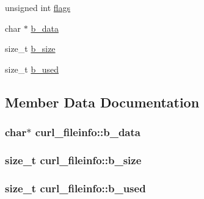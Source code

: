 \begin{DoxyCompactItemize}
\begin{tabbing}
\end{tabbing}\item 
unsigned int \hyperlink{structcurl__fileinfo_a4db8370a5202c50f4e3cf57bc0002c79}{flags}
\item 
char $\ast$ \hyperlink{structcurl__fileinfo_a3cf37a35ea7150ebf3b084c8804832c5}{b\+\_\+data}
\item 
size\+\_\+t \hyperlink{structcurl__fileinfo_a4831476a8e9e0af283275d04cc2b4108}{b\+\_\+size}
\item 
size\+\_\+t \hyperlink{structcurl__fileinfo_a35a78449a69e80e8c1d28449fcae89b9}{b\+\_\+used}
\end{DoxyCompactItemize}


\subsection{Member Data Documentation}
\subsubsection[{\texorpdfstring{b\+\_\+data}{b_data}}]{\setlength{\rightskip}{0pt plus 5cm}char$\ast$ curl\+\_\+fileinfo\+::b\+\_\+data}\hypertarget{structcurl__fileinfo_a3cf37a35ea7150ebf3b084c8804832c5}{}\label{structcurl__fileinfo_a3cf37a35ea7150ebf3b084c8804832c5}
\subsubsection[{\texorpdfstring{b\+\_\+size}{b_size}}]{\setlength{\rightskip}{0pt plus 5cm}size\+\_\+t curl\+\_\+fileinfo\+::b\+\_\+size}\hypertarget{structcurl__fileinfo_a4831476a8e9e0af283275d04cc2b4108}{}\label{structcurl__fileinfo_a4831476a8e9e0af283275d04cc2b4108}
\subsubsection[{\texorpdfstring{b\+\_\+used}{b_used}}]{\setlength{\rightskip}{0pt plus 5cm}size\+\_\+t curl\+\_\+fileinfo\+::b\+\_\+used}\hypertarget{structcurl__fileinfo_a35a78449a69e80e8c1d28449fcae89b9}{}\label{structcurl__fileinfo_a35a78449a69e80e8c1d28449fcae89b9}
